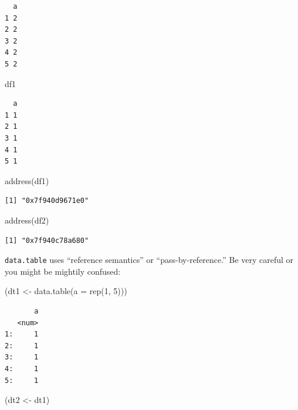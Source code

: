 \documentclass[
]{book}
\newenvironment{Shaded}{\begin{snugshade}}{\end{snugshade}}
\newcommand{\AttributeTok}[1]{\textcolor[rgb]{0.77,0.63,0.00}{#1}}
\newcommand{\DecValTok}[1]{\textcolor[rgb]{0.00,0.00,0.81}{#1}}
\newcommand{\FunctionTok}[1]{\textcolor[rgb]{0.00,0.00,0.00}{#1}}
\newcommand{\NormalTok}[1]{#1}
\newcommand{\OtherTok}[1]{\textcolor[rgb]{0.56,0.35,0.01}{#1}}
\begin{document}
\begin{verbatim}
  a
1 2
2 2
3 2
4 2
5 2
\end{verbatim}

\begin{Shaded}
\begin{Highlighting}[]
\NormalTok{df1}
\end{Highlighting}
\end{Shaded}

\begin{verbatim}
  a
1 1
2 1
3 1
4 1
5 1
\end{verbatim}

\begin{Shaded}
\begin{Highlighting}[]
\FunctionTok{address}\NormalTok{(df1)}
\end{Highlighting}
\end{Shaded}

\begin{verbatim}
[1] "0x7f940d9671e0"
\end{verbatim}

\begin{Shaded}
\begin{Highlighting}[]
\FunctionTok{address}\NormalTok{(df2)}
\end{Highlighting}
\end{Shaded}

\begin{verbatim}
[1] "0x7f940c78a680"
\end{verbatim}

\texttt{data.table} uses ``reference semantics'' or ``pass-by-reference.'' Be very careful or you might be mightily confused:

\begin{Shaded}
\begin{Highlighting}[]
\NormalTok{(dt1 }\OtherTok{\textless{}{-}} \FunctionTok{data.table}\NormalTok{(}\AttributeTok{a =} \FunctionTok{rep}\NormalTok{(}\DecValTok{1}\NormalTok{, }\DecValTok{5}\NormalTok{)))}
\end{Highlighting}
\end{Shaded}

\begin{verbatim}
       a
   <num>
1:     1
2:     1
3:     1
4:     1
5:     1
\end{verbatim}

\begin{Shaded}
\begin{Highlighting}[]
\NormalTok{(dt2 }\OtherTok{\textless{}{-}}\NormalTok{ dt1)}
\end{Highlighting}
\end{Shaded}
\end{document}
